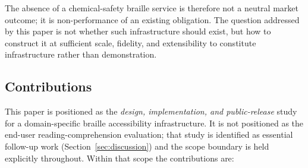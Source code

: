 \documentclass[journal]{IEEEtran}
\begin{document}
The absence of a chemical-safety braille service is therefore not a neutral market outcome; it is non-performance of an existing obligation. The question addressed by this paper is not whether such infrastructure should exist, but how to construct it at sufficient scale, fidelity, and extensibility to constitute infrastructure rather than demonstration.

\subsection{Contributions}

This paper is positioned as the \emph{design, implementation, and public-release} study for a domain-specific braille accessibility infrastructure. It is not positioned as the end-user reading-comprehension evaluation; that study is identified as essential follow-up work (Section~\ref{sec:discussion}) and the scope boundary is held explicitly throughout. Within that scope the contributions are:
\end{document}
